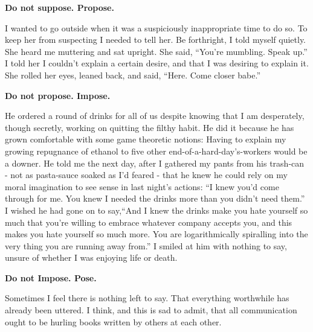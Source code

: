 \documentclass{article}
\begin{document}
\newline

\textbf{Do not suppose. Propose.}
\newline

I wanted to go outside when it was a suspiciously inappropriate time to
do so. To keep her from suspecting I needed to tell her. Be forthright,
I told myself quietly. She heard me muttering and sat upright. She
said, ``You're mumbling. Speak up.'' I told her I couldn't explain
a certain desire, and that I was desiring to explain it. She rolled her
eyes, leaned back, and said, ``Here. Come closer babe.'' \newline
\newline

\textbf{Do not propose. Impose.}
\newline

He ordered a round of drinks for all of us despite knowing that I am
desperately, though secretly, working on quitting the filthy habit. He
did it because he has grown comfortable with some game theoretic
notions: Having to explain my growing repugnance of ethanol to five
other end-of-a-hard-day's-workers would be a downer. He told me the next
day, after I gathered my pants from his trash-can - not as pasta-sauce
soaked as I'd feared - that he knew he could rely on my moral
imagination to see sense in last night's actions: ``I knew you'd come
through for me. You knew I needed the drinks more than you didn't need
them.'' I wished he had gone on to say,``And I knew the drinks make you
hate yourself so much that you're willing to embrace whatever company
accepts you, and this makes you hate yourself so much more. You are
logarithmically spiralling into the very thing you are running away
from.'' I smiled at him with nothing to say, unsure of whether I was
enjoying life or death. \newline \newline


\textbf{Do not Impose. Pose.}
\newline

Sometimes I feel there is nothing left to say. That everything
worthwhile has already been uttered. I think, and this is sad to admit,
that all communication ought to be hurling books written by others at
each other.\newline \newline
\end{document}

